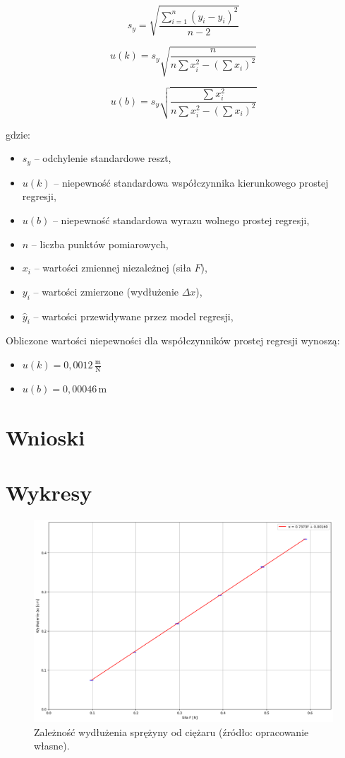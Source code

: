 \documentclass[a4paper,12pt]{article}
\begin{document}
\[
    s_y = \sqrt{\frac{\sum_{i=1}^{n} (y_i - \hat{y}_i)^2}{n-2}}
\]

\[
    u(k) = s_y \sqrt{\frac{n}{n \sum x_i^2 - \left( \sum x_i \right)^2}}
\]

\[
    u(b) = s_y \sqrt{\frac{\sum x_i^2}{n \sum x_i^2 - \left( \sum x_i \right)^2}}
\]

gdzie:

\begin{itemize}
    \setlength{\itemsep}{0em}
    \item $s_y$ -- odchylenie standardowe reszt,
    \item $u(k)$ -- niepewność standardowa współczynnika kierunkowego prostej regresji,
    \item $u(b)$ -- niepewność standardowa wyrazu wolnego prostej regresji,
    \item $n$ -- liczba punktów pomiarowych,
    \item $x_i$ -- wartości zmiennej niezależnej (siła $F$),
    \item $y_i$ -- wartości zmierzone (wydłużenie $\Delta x$),
    \item $\hat{y}_i$ -- wartości przewidywane przez model regresji,
\end{itemize}

Obliczone wartości niepewności dla współczynników prostej regresji wynoszą:

\begin{itemize}
    \setlength{\itemsep}{0em}
    \item $u(k) = 0,0012\,\frac{\text{m}}{\text{N}}$
    \item $u(b) = 0,00046\,\text{m}$
\end{itemize}


\section{Wnioski}

\section{Wykresy}

\begin{figure}[H]
    \centering
    \includegraphics[width=1.2\linewidth,angle=90]{2-x(F).png}
    \caption{Zależność wydłużenia sprężyny od ciężaru (źródło: opracowanie własne).}
    \label{fig:zaleznosci}
\end{figure}




\end{document}
